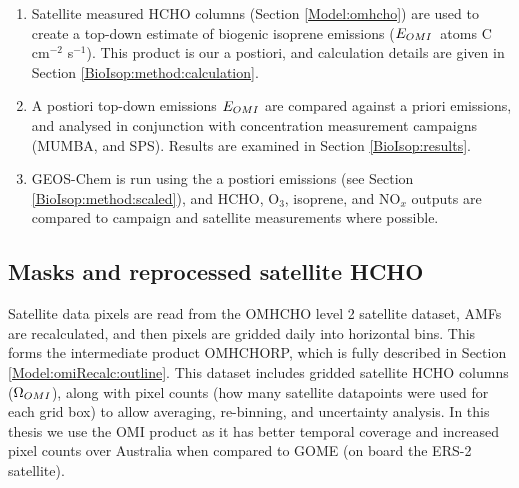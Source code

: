 \begin{enumerate}
      \item 
        Satellite measured HCHO columns (Section \ref{Model:omhcho}) are used to create a top-down estimate of biogenic isoprene emissions ($E_{OMI}$~atoms C cm$^{-2}$ s$^{-1}$).
        This product is our a postiori, and calculation details are given in Section \ref{BioIsop:method:calculation}.
      \item 
        A postiori top-down emissions $E_{OMI}$ are compared against a priori emissions, and analysed in conjunction with concentration measurement campaigns (MUMBA, and SPS).%
        Results are examined in Section \ref{BioIsop:results}.
      \item 
        GEOS-Chem is run using the a postiori emissions (see Section \ref{BioIsop:method:scaled}), and HCHO, O$_3$, isoprene, and NO$_x$ outputs are compared to campaign and satellite measurements where possible.
    \end{enumerate}
    
    
  
  \subsection{Masks and reprocessed satellite HCHO}
    
    Satellite data pixels are read from the OMHCHO level 2 satellite dataset, AMFs are recalculated, and then pixels are gridded daily into \highhr horizontal bins. 
    This forms the intermediate product OMHCHORP, which is fully described in Section \ref{Model:omiRecalc:outline}.
    This dataset includes gridded satellite HCHO columns ($\Omega_{OMI}$), along with pixel counts (how many satellite datapoints were used for each grid box) to allow averaging, re-binning, and uncertainty analysis.
    In this thesis we use the OMI product as it has better temporal coverage and increased pixel counts over Australia when compared to GOME (on board the ERS-2 satellite).
    
